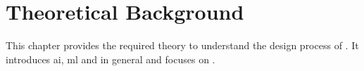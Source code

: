 \chapter{Theoretical Background}
\label{ch:theoretical_background}

This chapter provides the required theory to understand the design process of .
It introduces \acrfull{ai}, \acrfull{ml} and  in general and focuses on .





